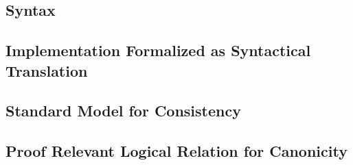 \subsection{Syntax}





\subsection{Implementation Formalized as Syntactical Translation}



\subsection{Standard Model for Consistency}




\subsection{Proof Relevant Logical Relation for Canonicity}


